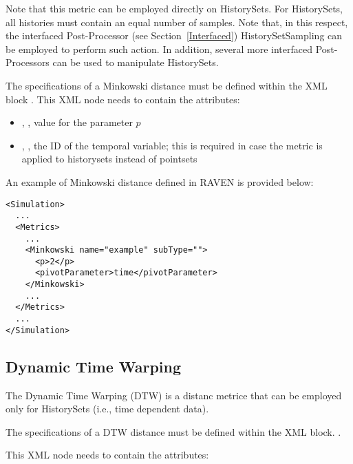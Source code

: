 Note that this metric can be employed directly on HistorySets.
For HistorySets, all histories must contain an equal number of samples. Note that, in this respect, the interfaced Post-Processor (see Section~\ref{Interfaced}) 
HistorySetSampling can be employed to perform such action. In addition, several more interfaced Post-Processors can be used to manipulate HistorySets.

The specifications of a Minkowski distance must be defined within the XML block
.
%
This XML node needs to contain the attributes:

\begin{itemize}
  \item {}, , value for the parameter $p$
  \item {}, , the ID of the temporal variable; this is required in case the metric is applied to historysets instead of pointsets
\end{itemize}

An example of Minkowski distance defined in RAVEN is provided below:
\begin{lstlisting}[style=XML]
<Simulation> 
  ...
  <Metrics>
    ...
    <Minkowski name="example" subType="">
      <p>2</p>
      <pivotParameter>time</pivotParameter>
    </Minkowski>
    ...
  </Metrics>
  ...
</Simulation>
\end{lstlisting}


\subsection{Dynamic Time Warping}
\label{subsection:DTW}
The Dynamic Time Warping (DTW) is a distanc metrice that can be employed only for HistorySets (i.e., time dependent data).

The specifications of a DTW distance must be defined within the XML block.
.

This XML node needs to contain the attributes:


